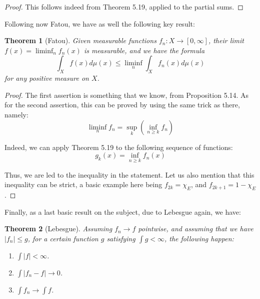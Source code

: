 \documentclass[12pt]{amsbook}
\newtheorem{theorem}{Theorem}[chapter]
\begin{document}
\begin{proof}
This follows indeed from Theorem 5.19, applied to the partial sums.
\end{proof}

Following now Fatou, we have as well the following key result:

\begin{theorem}[Fatou]
Given measurable functions $f_n:X\to[0,\infty]$, their limit $f(x)=\liminf_nf_n(x)$ is measurable, and we have the formula
$$\int_Xf(x)d\mu(x)\leq\liminf_n\int_Xf_n(x)d\mu(x)$$
for any positive measure on $X$.
\end{theorem}

\begin{proof}
The first assertion is something that we know, from Proposition 5.14. As for the second assertion, this can be proved by using the same trick as there, namely: 
$$\liminf_nf_n=\sup_k\left(\inf_{n\geq k}f_n\right)$$

Indeed, we can apply Theorem 5.19 to the following sequence of functions:
$$g_k(x)=\inf_{n\geq k}f_n(x)$$

Thus, we are led to the inequality in the statement. Let us also mention that this inequality can be strict, a basic example here being $f_{2k}=\chi_E$, and $f_{2k+1}=1-\chi_E$.
\end{proof}

Finally, as a last basic result on the subject, due to Lebesgue again, we have:

\begin{theorem}[Lebesgue]
Assuming $f_n\to f$ pointwise, and assuming that we have $|f_n|\leq g$, for a certain function $g$ satisfying $\int g<\infty$, the following happen:
\begin{enumerate}
\item $\int|f|<\infty$.

\item $\int|f_n-f|\to0$.

\item $\int f_n\to\int f$.
\end{enumerate}
\end{theorem}
\end{document}
